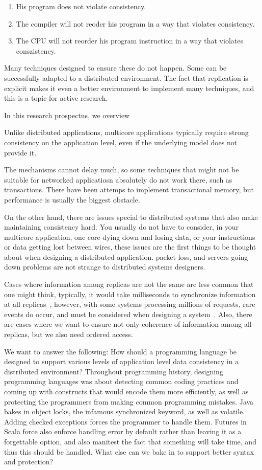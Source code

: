 \documentclass[]{usiinfprospectus}
\begin{document}
\begin{enumerate}
	\item His program does not violate consistency.
	\item The compiler will not reoder his program in a way that violates consistency.
	\item The CPU will not reorder his program instruction in a way that violates conszistency.
\end{enumerate}

Many techniques designed to ensure these do not happen. Some can be successfully adapted to a distributed environment. The fact that replication is explicit makes it even a better environment to implement many techniques, and this is a topic for active research.

In this research prospectus, we overview 


Unlike distributed applications, multicore applications typically require strong consistency on the application level, even if the underlying model does not provide it. 

The mechanisms cannot delay much, so some techniques that might not be suitable for networked applicatiosn absolutely do not work there, such as transactions. There have been attemps to implement transactional memory, but performance is usually the biggest obstacle. 

On the other hand, there are issues special to distributed systems that also make maintaining consistency hard. You usually do not have to consider, in your multicore application, one core dying down and losing data, or your instructions or data getting lost between wires, these issues are the first things to be thought about when designing a distributed application. packet loss, and servers going down problems are not strange to distributed systems designers. 


Cases where information among replicas are not the same are less common that one might think, typically, it would take milliseconds to synchronize information at all replicas~\cite{cockcroft2011benchmarking}, however, with some systems processing millions of requests, rare events do occur, and must be considered when designing a system~\cite{vogels2009eventually}.
Also, there are cases where we want to ensure not only coherence of information among all replicas, but we also need ordered access.


We want to answer the following: How should a programming language be designed to support various levels of application level data consistency in a distributed environment? Throughout programming history, designing programming languages was about detecting common coding practices and coming up with constructs that would encode them more efficiently, as well as protecting the programmers from making common programming mistakes. Java bakes in object locks, the infamous synchronized keyword, as well as volatile. Adding checked exceptions forces the programmer to handle them. Futures in Scala force also enforce handling error by default rather than leaving it as a forgettable option, and also manitest the fact that something will take time, and thus this should be handled. What else can we bake in to support better syntax and protection?
\end{document}
